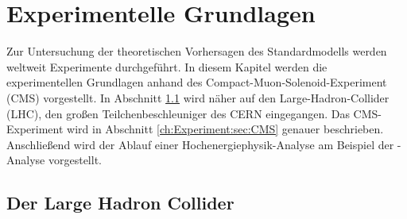 \chapter{Experimentelle Grundlagen}
\label{ch:experiment}

{}

Zur Untersuchung der theoretischen Vorhersagen des Standardmodells werden weltweit Experimente durchgef\"uhrt. In diesem Kapitel werden die experimentellen Grundlagen anhand des Compact-Muon-Solenoid-Experiment (CMS) vorgestellt. In Abschnitt \ref{ch:Experiment:sec:LHC} wird n\"aher auf den Large-Hadron-Collider (LHC), den gro\ss en Teilchenbeschleuniger des CERN eingegangen. Das CMS-Experiment wird in Abschnitt \ref{ch:Experiment:sec:CMS} genauer beschrieben.\\%
Anschlie\ss end wird der Ablauf einer Hochenergiephysik-Analyse am Beispiel der \ttH-Analyse vorgestellt.

\section{Der Large Hadron Collider}
\label{ch:Experiment:sec:LHC}

